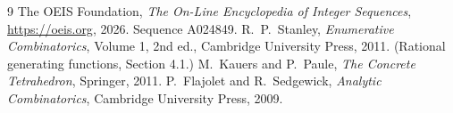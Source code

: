 \documentclass[11pt,a4paper]{article}
\theoremstyle{plain}
\theoremstyle{definition}
\begin{document}
\begin{thebibliography}{9}
 The OEIS Foundation, \emph{The On-Line Encyclopedia of Integer
Sequences}, \url{https://oeis.org}, 2026. Sequence A024849.
 R.~P.~Stanley, \emph{Enumerative Combinatorics}, Volume 1, 2nd ed.,
Cambridge University Press, 2011. (Rational generating functions, Section 4.1.)
 M.~Kauers and P.~Paule, \emph{The Concrete Tetrahedron}, Springer, 2011.
 P.~Flajolet and R.~Sedgewick, \emph{Analytic Combinatorics}, Cambridge
University Press, 2009.
\end{thebibliography}
\end{document}
